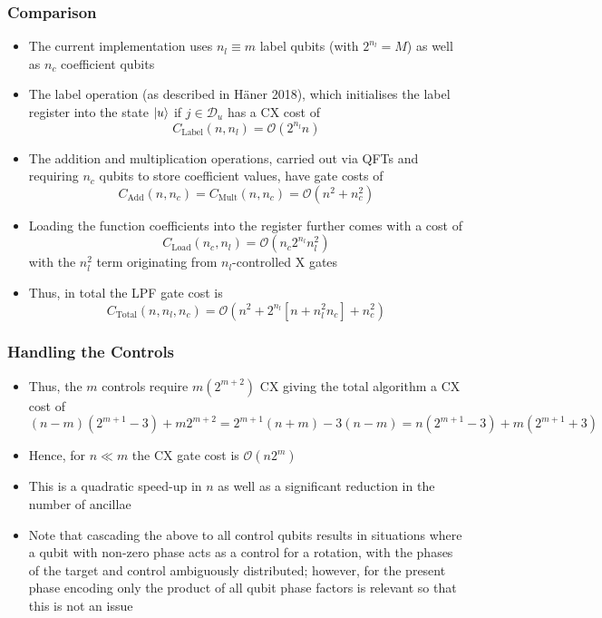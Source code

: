 \documentclass{beamer}
\begin{document}
\begin{frame}
\frametitle{Comparison}
\begin{itemize}
\item The current implementation uses $n_l \equiv m$ label qubits (with $2^{n_l} =M$) as well as $n_c$ coefficient qubits  
\item The label operation (as described in H\"aner 2018), which initialises the label register into the state $\ket{u}$ if $j \in \mathcal{D}_u$ has a CX cost of 
\begin{equation}
C_\text{Label}(n, n_l) = \mathcal{O}(2^{n_l} n)
\end{equation}
\item The addition and multiplication operations, carried out via QFTs and requiring $n_c$ qubits to store coefficient values, have  gate costs of 
\begin{equation}
C_\text{Add}(n, n_c) = C_\text{Mult}(n,n_c) = \mathcal{O}( n^2 + n_c^2)
\end{equation}
\item Loading the function coefficients into the register further comes with a cost of 
\begin{equation}
C_\text{Load}(n_c,n_l) = \mathcal{O}(n_c 2^{n_l} n_l^2)
\end{equation}
with the $n_l^2$ term originating from $n_l$-controlled X gates
\item Thus, in total the LPF gate cost is 
\begin{equation}
C_\text{Total} (n , n_l, n_c) = \mathcal{O}(n^2 + 2^{n_l} [n + n_l^2 n_c] + n_c^2)
\end{equation}
\end{itemize}
\end{frame}

\begin{frame}
\frametitle{Handling the Controls}
\begin{itemize}
\item Thus, the $m$ controls require $m (2^{m+2})$ CX giving the total algorithm a CX cost of 
\begin{equation}
(n-m) (2^{m+1} -3) + m 2^{m+2} = 2^{m +1} \left( n + m  \right) - 3 (n-m) = n (2^{m+1} -3) + m (2^{m+1} +3)
\end{equation}
\item Hence, for $n \ll m$ the CX gate cost is $\mathcal{O}(n 2^m)$
\item This is a quadratic speed-up in $n$ as well as a significant reduction in the number of ancillae 
\item Note that cascading the above to all control qubits results in situations where a qubit with non-zero phase acts as a control for a rotation, with the phases of the target and control ambiguously distributed; however, for the present phase encoding only the product of all qubit phase factors is relevant so that this is not an issue  
\end{itemize}

\end{frame}
\end{document}
